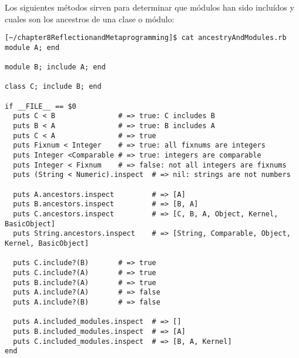 Los siguientes métodos sirven para determinar que módulos han sido incluídos 
y cuales son los ancestros de una clase o módulo:
\begin{verbatim}
[~/chapter8ReflectionandMetaprogramming]$ cat ancestryAndModules.rb 
module A; end

module B; include A; end

class C; include B; end

if __FILE__ == $0
  puts C < B               # => true: C includes B
  puts B < A               # => true: B includes A
  puts C < A               # => true
  puts Fixnum < Integer    # => true: all fixnums are integers
  puts Integer <Comparable # => true: integers are comparable
  puts Integer < Fixnum    # => false: not all integers are fixnums
  puts (String < Numeric).inspect  # => nil: strings are not numbers
  
  puts A.ancestors.inspect         # => [A]
  puts B.ancestors.inspect         # => [B, A]
  puts C.ancestors.inspect         # => [C, B, A, Object, Kernel, BasicObject]
  puts String.ancestors.inspect    # => [String, Comparable, Object, Kernel, BasicObject]
 
  puts C.include?(B)       # => true
  puts C.include?(A)       # => true
  puts B.include?(A)       # => true
  puts A.include?(A)       # => false 
  puts A.include?(B)       # => false

  puts A.included_modules.inspect  # => []
  puts B.included_modules.inspect  # => [A]
  puts C.included_modules.inspect  # => [B, A, Kernel]
end
\end{verbatim}

